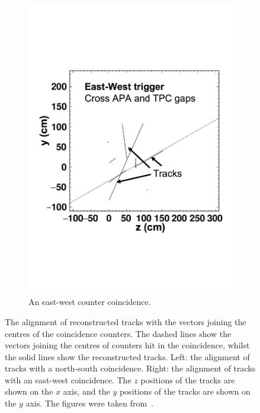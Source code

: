 \begin{figure}
\begin{subfigure}{0.48\textwidth}
    \includegraphics[width=\textwidth]{east-west}
    \caption{An east-west counter coincidence.}
  \end{subfigure}
  \caption[The alignment of reconstructed tracks with the vectors joining the centres of the coincidence counters]
          {The alignment of reconstructed tracks with the vectors joining the centres of the coincidence counters. The dashed lines show the vectors joining the centres of counters hit in the coincidence, whilst the solid lines show the reconstructed tracks. Left: the alignment of tracks with a north-south coincidence. Right: the alignment of tracks with an east-west coincidence. The $z$ positions of the tracks are shown on the $x$ axis, and the $y$ positions of the tracks are shown on the $y$ axis. The figures were taken from~\citep{TingjunClustering}.}
          \label{fig:CounterTrackAngle}
\end{figure}

